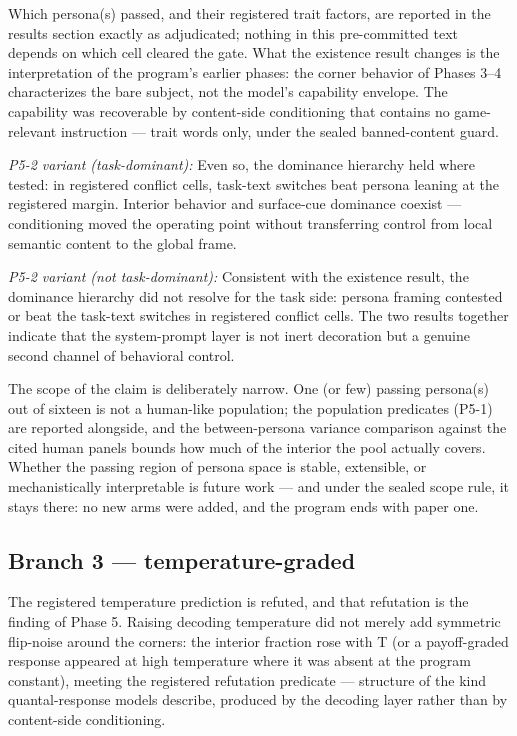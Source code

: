 \documentclass[11pt]{article}
\begin{document}
Which persona(s) passed, and their registered trait factors, are
reported in the results section exactly as adjudicated; nothing in this
pre-committed text depends on which cell cleared the gate. What the
existence result changes is the interpretation of the program's earlier
phases: the corner behavior of Phases 3--4 characterizes the bare
subject, not the model's capability envelope. The capability was
recoverable by content-side conditioning that contains no game-relevant
instruction --- trait words only, under the sealed banned-content guard.

\emph{P5-2 variant (task-dominant):} Even so, the dominance hierarchy
held where tested: in registered conflict cells, task-text switches beat
persona leaning at the registered margin. Interior behavior and
surface-cue dominance coexist --- conditioning moved the operating point
without transferring control from local semantic content to the global
frame.

\emph{P5-2 variant (not task-dominant):} Consistent with the existence
result, the dominance hierarchy did not resolve for the task side:
persona framing contested or beat the task-text switches in registered
conflict cells. The two results together indicate that the system-prompt
layer is not inert decoration but a genuine second channel of behavioral
control.

The scope of the claim is deliberately narrow. One (or few) passing
persona(s) out of sixteen is not a human-like population; the population
predicates (P5-1) are reported alongside, and the between-persona
variance comparison against the cited human panels bounds how much of
the interior the pool actually covers. Whether the passing region of
persona space is stable, extensible, or mechanistically interpretable is
future work --- and under the sealed scope rule, it stays there: no new
arms were added, and the program ends with paper one.

\subsection{Branch 3 ---
temperature-graded}\label{branch-3-temperature-graded}

The registered temperature prediction is refuted, and that refutation is
the finding of Phase 5. Raising decoding temperature did not merely add
symmetric flip-noise around the corners: the interior fraction rose with
T (or a payoff-graded response appeared at high temperature where it was
absent at the program constant), meeting the registered refutation
predicate --- structure of the kind quantal-response models describe,
produced by the decoding layer rather than by content-side conditioning.
\end{document}
